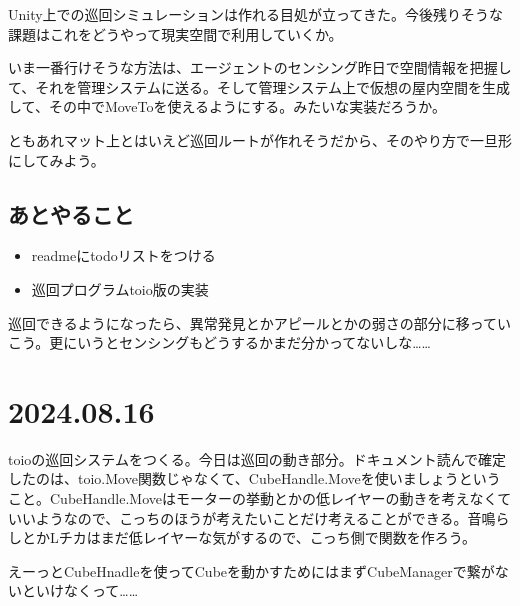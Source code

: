 \documentclass[twocolumn]{mynote}
\begin{document}
Unity上での巡回シミュレーションは作れる目処が立ってきた。今後残りそうな課題はこれをどうやって現実空間で利用していくか。

いま一番行けそうな方法は、エージェントのセンシング昨日で空間情報を把握して、それを管理システムに送る。そして管理システム上で仮想の屋内空間を生成して、その中でMoveToを使えるようにする。みたいな実装だろうか。

ともあれマット上とはいえど巡回ルートが作れそうだから、そのやり方で一旦形にしてみよう。

\subsection*{あとやること}
\begin{itemize}
  \item readmeにtodoリストをつける
  \item 巡回プログラムtoio版の実装
\end{itemize}

巡回できるようになったら、異常発見とかアピールとかの弱さの部分に移っていこう。更にいうとセンシングもどうするかまだ分かってないしな……

\section*{2024.08.16}
toioの巡回システムをつくる。今日は巡回の動き部分。ドキュメント読んで確定したのは、toio.Move関数じゃなくて、CubeHandle.Moveを使いましょうということ。CubeHandle.Moveはモーターの挙動とかの低レイヤーの動きを考えなくていいようなので、こっちのほうが考えたいことだけ考えることができる。音鳴らしとかLチカはまだ低レイヤーな気がするので、こっち側で関数を作ろう。

えーっとCubeHnadleを使ってCubeを動かすためにはまずCubeManagerで繋がないといけなくって……
\end{document}
